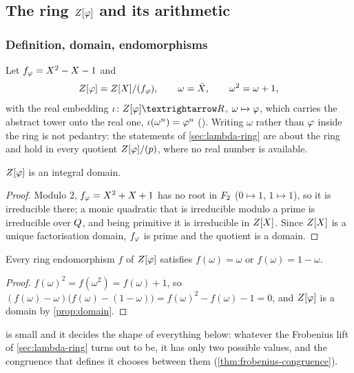 \subsection{The ring $Z[\varphi]$ and its arithmetic}\label{sec:ring}

\subsubsection{Definition, domain, endomorphisms}

Let $f_\varphi=X^2-X-1$ and
\[
  Z[\varphi]=Z[X]/(f_\varphi),\qquad \omega=\bar X,\qquad \omega^2=\omega+1,
\]
with the real embedding $\iota\colon\Zphi\to\R$, $\omega\mapsto\varphi$, which
carries the abstract tower onto the real one, $\iota(\omega^n)=\varphi^n$
().  Writing $\omega$ rather than
$\varphi$ inside the ring is not pedantry: the statements of
\cref{sec:lambda-ring} are about the ring and hold in every quotient
$Z[\varphi]/(p)$, where no real number is available.

\begin{proposition}\label{prop:domain}
$Z[\varphi]$ is an integral domain.
\end{proposition}
\begin{proof}
Modulo $2$, $f_\varphi=X^2+X+1$ has no root in $F_2$ ($0\mapsto1$,
$1\mapsto1$), so it is irreducible there; a monic quadratic that is irreducible
modulo a prime is irreducible over $Q$, and being primitive it is irreducible in
$Z[X]$.  Since $Z[X]$ is a unique factorisation domain, $f_\varphi$ is prime
and the quotient is a domain.
\end{proof}

\begin{proposition}\label{prop:endo}
Every ring endomorphism $f$ of $Z[\varphi]$ satisfies $f(\omega)=\omega$ or
$f(\omega)=1-\omega$.
\end{proposition}
\begin{proof}
$f(\omega)^2=f(\omega^2)=f(\omega)+1$, so
$(f(\omega)-\omega)\bigl(f(\omega)-(1-\omega)\bigr)=f(\omega)^2-f(\omega)-1=0$,
and $Z[\varphi]$ is a domain by \cref{prop:domain}.
\end{proof}

 is small and it decides the shape of everything below: whatever
the Frobenius lift of \cref{sec:lambda-ring} turns out to be, it has only two
possible values, and the congruence that defines it chooses between them
(\cref{thm:frobenius-congruence}).

